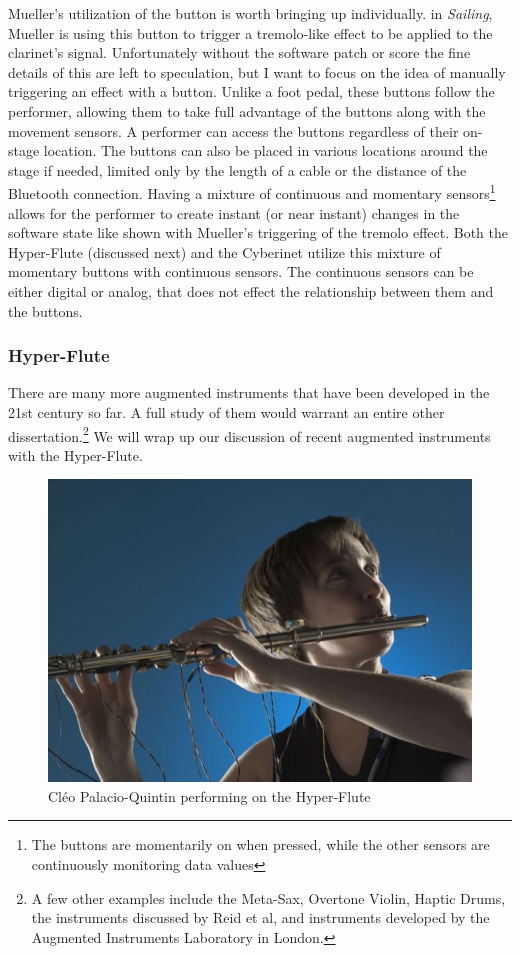 Mueller's utilization of the button is worth bringing up individually. in \textit{Sailing}, Mueller is using this button to trigger a tremolo-like effect to be applied to the clarinet's signal. Unfortunately without the software patch or score the fine details of this are left to speculation, but I want to focus on the idea of manually triggering an effect with a button. Unlike a foot pedal, these buttons follow the performer, allowing them to take full advantage of the buttons along with the movement sensors. A performer can access the buttons regardless of their on-stage location. The buttons can also be placed in various locations around the stage if needed, limited only by the length of a cable or the distance of the Bluetooth connection. Having a mixture of continuous and momentary sensors\footnote{The buttons are momentarily on when pressed, while the other sensors are continuously monitoring data values} allows for the performer to create instant (or near instant) changes in the software state like shown with Mueller's triggering of the tremolo effect. Both the Hyper-Flute (discussed next) and the Cyberinet utilize this mixture of momentary buttons with continuous sensors. The continuous sensors can be either digital or analog, that does not effect the relationship between them and the buttons.


\subsubsection{Hyper-Flute}

There are many more augmented instruments that have been developed in the 21st century so far. A full study of them would warrant an entire other dissertation.\footnote{A few other examples include the Meta-Sax, Overtone Violin, Haptic Drums, the instruments discussed by Reid et al\cite{reid2018}, and instruments developed by the Augmented Instruments Laboratory in London.} We will wrap up our discussion of recent augmented instruments with the Hyper-Flute.

\begin{figure}
    \centering
    \includegraphics[scale=0.5]{diagrams/palacio_quintin_cleo.jpg}
    \caption{Cléo Palacio-Quintin performing on the Hyper-Flute}
    \label{fig:hyper-flute}
\end{figure}

